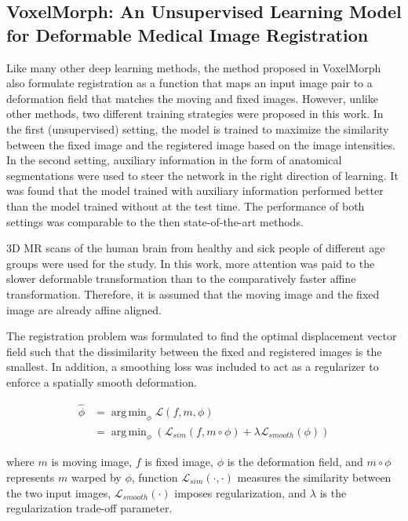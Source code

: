 \documentclass{report}
\DeclareMathOperator*{\argmin}{arg\,min}
\begin{document}
	\subsection{VoxelMorph: An Unsupervised Learning Model for Deformable Medical Image Registration} 
	Like many other deep learning methods, the method proposed in VoxelMorph \cite{8579062} \cite{Balakrishnan_2019} also formulate registration as a function that maps an input image pair to a deformation field that matches the moving and fixed images. However, unlike other methods, two different training strategies were proposed in this work. In the first (unsupervised) setting, the model is trained to maximize the similarity between the fixed image and the registered image based on the image intensities. In the second setting, auxiliary information in the form of anatomical segmentations were used to steer the network in the right direction of learning. It was found that the model trained with auxiliary information performed better than the model trained without at the test time. The performance of both settings was comparable to the then state-of-the-art methods.
	
	3D MR scans of the human brain from healthy and sick people of different age groups were used for the study. In this work, more attention was paid to the slower deformable transformation than to the comparatively faster affine transformation. Therefore, it is assumed that the moving image and the fixed image are already affine aligned.
	
	The registration problem was formulated to find the optimal displacement vector field such that the dissimilarity between the fixed and registered images is the smallest. In addition, a smoothing loss was included to act as a regularizer to enforce a spatially smooth deformation.
	
	
	\begin{equation} \label{loss_vxm}
	\begin{split}
	\hat{\phi} & = \argmin_\phi \mathcal{L}(f,m,\phi) \\
	& = \argmin_\phi (\mathcal{L}_{sim}(f,m \circ \phi) + \lambda \mathcal{L}_{smooth}(\phi))
	\end{split}
	\end{equation}
	
	where $m$ is moving image, $f$ is fixed image, $\phi$ is the deformation field, and $m \circ \phi$ represents $m$ warped by $\phi$, function $\mathcal{L}_{sim}(\cdot,\cdot)$ measures the similarity between the two input images, $\mathcal{L}_{smooth}(\cdot)$ imposes regularization, and $\lambda$ is the regularization trade-off parameter.
	
\end{document}
